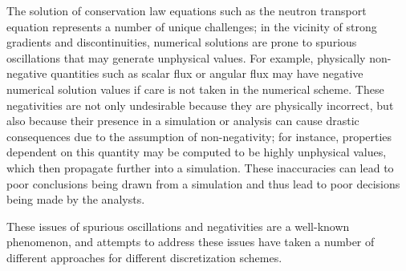 The solution of conservation law equations such as the neutron transport
equation represents a number of unique challenges; in the vicinity of strong
gradients and discontinuities, numerical solutions are prone to spurious
oscillations that may generate unphysical values. For example, physically
non-negative quantities such as scalar flux or angular flux may have negative
numerical solution values if care is not taken in the numerical scheme.
These negativities are not only undesirable because they are physically
incorrect, but also because their presence in a simulation or analysis
can cause drastic consequences due to the assumption of non-negativity;
for instance, properties dependent on this quantity may be computed
to be highly unphysical values, which then propagate further into
a simulation. These inaccuracies can lead to poor conclusions being drawn
from a simulation and thus lead to poor decisions being made by the analysts.

These issues of spurious oscillations and negativities are a well-known
phenomenon, and attempts to address these issues have taken a number
of different approaches for different discretization schemes.
